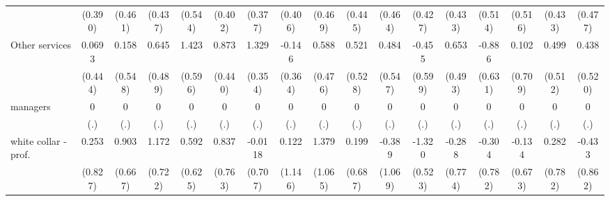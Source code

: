 {\begin{tabular}{l*{16}{c}}
                    &     (0.390)         &     (0.461)         &     (0.437)         &     (0.544)         &     (0.402)         &     (0.377)         &     (0.406)         &     (0.469)         &     (0.445)         &     (0.464)         &     (0.427)         &     (0.433)         &     (0.514)         &     (0.516)         &     (0.433)         &     (0.477)         \\
[1em]
Other services      &      0.0693         &       0.158         &       0.645         &       1.423\sym{*}  &       0.873\sym{*}  &       1.329\sym{***}&      -0.146         &       0.588         &       0.521         &       0.484         &      -0.455         &       0.653         &      -0.886         &       0.102         &       0.499         &       0.438         \\
                    &     (0.444)         &     (0.548)         &     (0.489)         &     (0.596)         &     (0.440)         &     (0.354)         &     (0.364)         &     (0.476)         &     (0.528)         &     (0.547)         &     (0.599)         &     (0.493)         &     (0.631)         &     (0.709)         &     (0.512)         &     (0.520)         \\
[1em]
managers            &           0         &           0         &           0         &           0         &           0         &           0         &           0         &           0         &           0         &           0         &           0         &           0         &           0         &           0         &           0         &           0         \\
                    &         (.)         &         (.)         &         (.)         &         (.)         &         (.)         &         (.)         &         (.)         &         (.)         &         (.)         &         (.)         &         (.)         &         (.)         &         (.)         &         (.)         &         (.)         &         (.)         \\
[1em]
white collar - prof.&       0.253         &       0.903         &       1.172         &       0.592         &       0.837         &     -0.0118         &       0.122         &       1.379         &       0.199         &      -0.389         &      -1.320\sym{*}  &      -0.288         &      -0.304         &      -0.134         &       0.282         &      -0.433         \\
                    &     (0.827)         &     (0.667)         &     (0.722)         &     (0.625)         &     (0.763)         &     (0.707)         &     (1.146)         &     (1.065)         &     (0.687)         &     (1.069)         &     (0.523)         &     (0.774)         &     (0.782)         &     (0.673)         &     (0.782)         &     (0.862)         \\

\end{tabular}}
